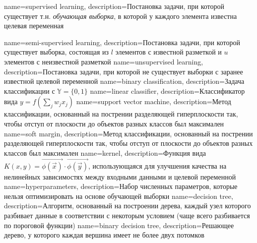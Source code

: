 \usepackage[acronym,toc]{glossaries}
\makenoidxglossaries

{
    name=supervised learning,
    description={Постановка задачи, при которой существует т.н. \textit{обучающая выборка}, в которой у каждого элемента известна целевая переменная}
}

{
    name=semi-supervised learning,
    description={Постановка задачи, при которой существует выборка, состоящая из $l$ элементов с известной разметкой и $u$ элементов с неизвестной разметкой}
}
{
    name=unsupervised learning,
    description={Постановка задачи, при которой не существует выборки с заранее известной целевой переменной}
}
{
    name=binary classification,
    description={Задача классификации с $\mathbb{Y} = \{0, 1\}$}
}
{
    name=linear classifier,
    description={Классификатор вида $y = f\left( \sum\limits_{j}^{} w_j x_j \right)$}
}
{
    name=support vector machine,
    description={Метод классификации, основанный на пострении разделяющей гиперплоскости так, чтобы отступ от плоскости до объектов разных классов был максимален}
}
{
    name=soft margin,
    description={Метод классификации, основанный на пострении разделяющей гиперплоскости так, чтобы отступ от плоскости до объектов разных классов был максимален}
}
{
    name=kernel,
    description={Функция вида $K(x, y) = \vec{\phi(\vec{x})} \cdot \vec{\phi(\vec{y})}$, использующаяся для улучшения качества на нелинейных зависимостях между входными данными и целевой переменной}
}
{
    name=hyperparameters,
    description={Набор численных параметров, которые нельзя оптимизировать на основе обучающей выборки}
}
{
    name=decision tree,
    description={Алгоритм, основанный на построении дерева, каждый узел которого разбивает данные в соответствии с некоторым условием (чаще всего разбивается по пороговой функции)}
}
{
    name=binary decision tree,
    description={Решающее дерево, у которого каждая вершина имеет не более двух потомков}
}
